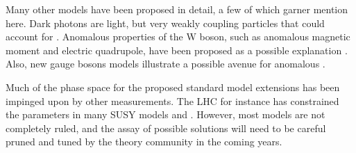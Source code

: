 Many other models have been proposed in detail, a few of which garner mention here.  Dark photons are light, but very weakly coupling particles that could account for \gmtwo {}.  Anomalous properties of the W boson, such as anomalous magnetic moment and electric quadrupole, have been proposed as a possible explanation .  Also, new gauge bosons models illustrate a possible avenue for anomalous \gmwo.  

Much of the phase space for the proposed standard model extensions has been impinged upon by other measurements.  The LHC for instance has constrained the parameters in many SUSY models and .  However, most models are not completely ruled, and the assay of possible solutions will need to be careful pruned and tuned by the theory community in the coming years.
